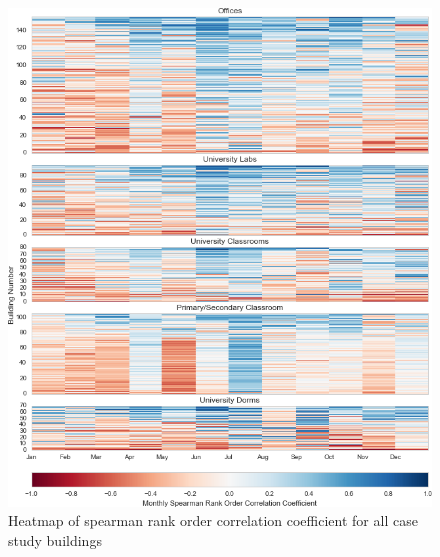 \begin{figure}[ht!]
\begin{center}
\includegraphics[width=1\columnwidth]{figures/spearman_heatmap/spearman_heatmap}
\caption{Heatmap of spearman rank order correlation coefficient for all case study buildings
\label{fig:spearman_heatmap}%
}
\end{center}
\end{figure}

